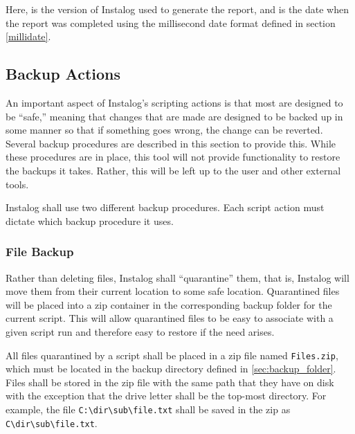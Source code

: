 Here,  is the version of Instalog used to generate the report, and
 is the date when the report was completed using the millisecond date
format defined in section \ref{millidate}.

\subsection{Backup Actions}
An important aspect of Instalog's scripting actions is that most are designed to
be ``safe,'' meaning that changes that are made are designed to be backed up in
some manner so that if something goes wrong, the change can be reverted. 
Several backup procedures are described in this section to provide this.  While
these procedures are in place, this tool will not provide functionality to
restore the backups it takes.  Rather, this will be left up to the user and
other external tools.

Instalog shall use two different backup procedures.  Each script action must
dictate which backup procedure it uses.  
\subsubsection{File Backup} \label{sec:file_backup}
Rather than deleting files, Instalog shall ``quarantine'' them, that is,
Instalog will move them from their current location to some safe location. 
Quarantined files will be placed into a zip container in the corresponding
backup folder for the current script.  This will allow quarantined files to be
easy to associate with a given script run and therefore easy to restore if the
need arises.  

All files quarantined by a script shall be placed in a zip file named
\verb|Files.zip|, which must be located in the backup directory defined in
\ref{sec:backup_folder}.  Files shall be stored in the zip file with the same
path that they have on disk with the exception that the drive letter shall be
the top-most directory.  For example, the file \verb|C:\dir\sub\file.txt| shall
be saved in the zip as \verb|C\dir\sub\file.txt|.
